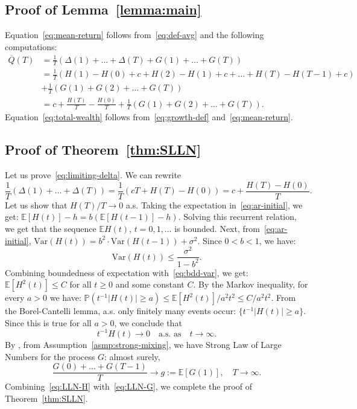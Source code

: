 \documentclass[12pt]{amsart}
\theoremstyle{definition}
\begin{document}
\subsection{Proof of Lemma~\ref{lemma:main}} Equation~\eqref{eq:mean-return} follows from~\eqref{eq:def-avg} and the following computations:
\begin{align*}
\overline{Q}(T) & = \frac1{T}\left(\Delta(1) + \ldots + \Delta(T) + G(1) + \ldots + G(T)\right) \\ & = \frac1{T}\left(H(1) - H(0) + c + H(2) - H(1) + c + \ldots + H(T) - H(T-1) + c\right) \\ & + \frac1{T}\left(G(1) + G(2) + \ldots + G(T)\right) \\ & = c + \frac{H(T)}{T} - \frac{H(0)}{T} + \frac1{T}\left(G(1) + G(2) + \ldots + G(T)\right).
\end{align*}
Equation~\eqref{eq:total-wealth} follows from~\eqref{eq:growth-def} and~\eqref{eq:mean-return}.

\subsection{Proof of Theorem~\ref{thm:SLLN}} Let us prove~\eqref{eq:limiting-delta}. We can rewrite 
$$
\frac1T\left(\Delta(1) + \ldots + \Delta(T)\right) = \frac1T\left(cT + H(T) - H(0)\right) = c + \frac{H(T) - H(0)}T.
$$
Let us show that $H(T)/T \to 0$ a.s. Taking the expectation in~\eqref{eq:ar-initial}, we get: $\mathbb E[H(t)] - h = b(\mathbb E[H(t-1)] - h)$. Solving this recurrent relation, we get that the sequence $\mathbb E H(t),\, t = 0, 1, \ldots$ is bounded. Next, from~\eqref{eq:ar-initial}, $\mathrm{Var}(H(t)) = b^2\cdot\mathrm{Var}(H(t-1)) + \sigma^2$. Since $0 < b < 1$, we have: 
\begin{equation}
\label{eq:bdd-var}
\mathrm{Var}(H(t)) \le \frac{\sigma^2}{1 - b^2}. 
\end{equation}
Combining boundedness of expectation with~\eqref{eq:bdd-var}, we get: $\mathbb E\left[H^2(t)\right] \le C$ for all $t \ge 0$ and some constant $C$. By the Markov inequality, for every $a > 0$ we have: $\mathbb P(t^{-1}|H(t)| \ge a) \le \mathbb E\left[H^2(t)\right]/a^2t^2 \le C/a^2t^2$. From the Borel-Cantelli lemma, a.s. only finitely many events occur:
$\{t^{-1}|H(t)| \ge a\}$. Since this is true for all $a > 0$, we conclude that 
\begin{equation}
\label{eq:LLN-H}
t^{-1}H(t) \to 0\quad \mbox{a.s. as}\quad t \to \infty.
\end{equation}
By \cite[Section 28.5, Theorem 6]{FGBook}, from Assumption~\ref{asmp:strong-mixing}, we have Strong Law of Large Numbers for the process $G$: almost surely, 
\begin{equation}
\label{eq:LLN-G}
\frac{G(0) + \ldots + G(T-1)}{T} \to g := \mathbb E[G(1)],\quad T \to \infty.
\end{equation}
Combining~\eqref{eq:LLN-H} with~\eqref{eq:LLN-G}, we complete the proof of Theorem~\ref{thm:SLLN}.
\end{document}
